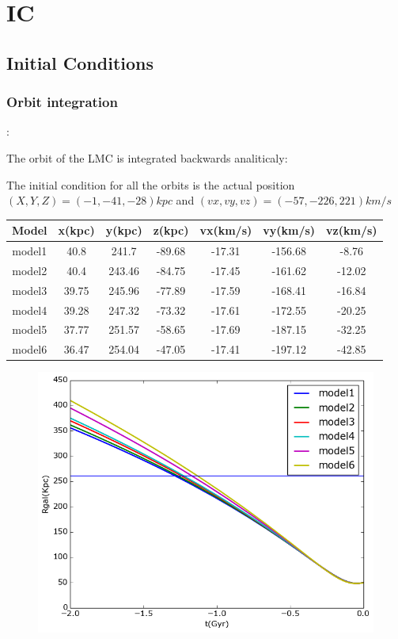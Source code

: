 \chapter{IC}\label{sec:IC}
\section{Initial Conditions}

\subsection{Orbit integration}:

The orbit of the LMC is integrated backwards analiticaly:

The initial condition for all the orbits is the actual position 
$(X, Y, Z) = (-1, -41, -28)kpc$ and $(vx, vy, vz) = (-57, -226, 221)km/s$

\begin{table}[H]
\begin{center}
\begin{tabular}{c c c c c c c}
\hline
Model & x(kpc) & y(kpc) & z(kpc) &vx(km/s) & vy(km/s) & vz(km/s)\\
\hline
model1 & 40.8 & 241.7 & -89.68  & -17.31 & -156.68 & -8.76 \\
model2 & 40.4 & 243.46 & -84.75 & -17.45 & -161.62 & -12.02 \\
model3 & 39.75 & 245.96 & -77.89 & -17.59 & -168.41 & -16.84 \\     
model4 & 39.28 & 247.32 & -73.32 & -17.61 & -172.55 & -20.25 \\
model5 & 37.77 & 251.57 & -58.65 & -17.69 & -187.15 & -32.25 \\ 
model6 & 36.47 & 254.04 & -47.05 & -17.41 & -197.12 & -42.85 \\
\hline
\end{tabular}
\end{center}
\end{table}


\begin{figure}[H]
\centering
\includegraphics[scale=0.7]{../code/LMC_orbit/LMC_orbits.png}
\end{figure}
